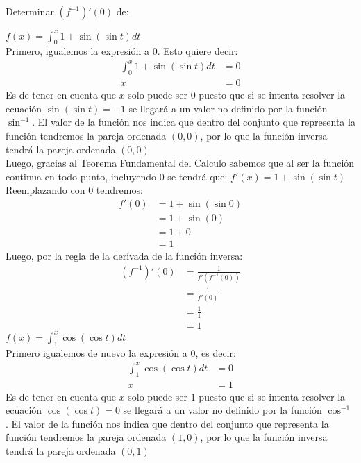 \documentclass[../../main.tex]{subfiles}
\begin{document}
    \question Determinar $(f^{-1})'(0)$ de:
    \begin{partes}
        \parte $f(x) = \int_{0}^x 1 + \sin(\sin t) dt$\\
        Primero, igualemos la expresión a $0$. Esto quiere decir:
        \begin{align*}
            \int_{0}^x 1 + \sin(\sin t) dt &= 0\\
            x &= 0
        \end{align*}
        Es de tener en cuenta que $x$ solo puede ser $0$ puesto que si se intenta resolver la ecuación $\sin(\sin t) = -1$ se llegará a un valor no definido por la función $\sin^{-1}$. El valor
        de la función nos indica que dentro del conjunto que representa la función tendremos la pareja ordenada $(0, 0)$, por lo que la función inversa tendrá la pareja ordenada $(0, 0)$\\
        Luego, gracias al Teorema Fundamental del Calculo sabemos que al ser la función continua en todo punto, incluyendo $0$ se tendrá que:
        $f'(x) = 1 + \sin(\sin t)$
        Reemplazando con $0$ tendremos:
        \begin{align*}
            f'(0) &= 1 + \sin(\sin 0)\\
            &= 1 + \sin(0)\\
            &= 1 + 0\\
            &= 1
        \end{align*}
        Luego, por la regla de la derivada de la función inversa:
        \begin{align*}
            (f^{-1})'(0) &= \frac{1}{f'(f^{-1}(0))}\\
            &= \frac{1}{f'(0)}\\
            &= \frac{1}{1}\\
            &= 1
        \end{align*}
        \parte $f(x) = \int_{1}^x \cos(\cos t) dt$\\
        Primero igualemos de nuevo la expresión a $0$, es decir:
        \begin{align*}
            \int_{1}^x  \cos(\cos t) dt &= 0\\
            x &= 1
        \end{align*}
        Es de tener en cuenta que $x$ solo puede ser $1$ puesto que si se intenta resolver la ecuación $\cos(\cos t) = 0$ se llegará a un valor no definido por la función $\cos^{-1}$. El valor
        de la función nos indica que dentro del conjunto que representa la función tendremos la pareja ordenada $(1, 0)$, por lo que la función inversa tendrá la pareja ordenada $(0, 1)$\\

\end{partes}
\end{document}
